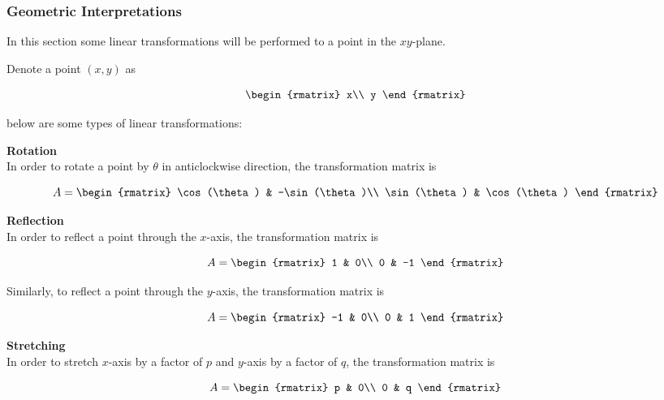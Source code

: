 \documentclass[a4paper,12pt]{article}
\begin{document}
\subsubsection{Geometric Interpretations}
In this section some linear transformations will be performed to a point in the $xy$-plane.\n

\begin{exm}
  Denote a point $(x,y)$ as

  $$\begin{rmatrix}
    x\\
    y
  \end{rmatrix}$$\s

  below are some types of linear transformations:

  \begin{alist}
    \item \textbf{Rotation}\\
    In order to rotate a point by $\theta$ in anticlockwise direction, the transformation matrix is

    $$A=\begin{rmatrix}
      \cos(\theta) & -\sin(\theta)\\
      \sin(\theta) & \cos(\theta)
    \end{rmatrix}$$

    \item \textbf{Reflection}\\
    In order to reflect a point through the $x$-axis, the transformation matrix is

    $$A=\begin{rmatrix}
      1 & 0\\
      0 & -1
    \end{rmatrix}$$\s

    Similarly, to reflect a point through the $y$-axis, the transformation matrix is

    $$A=\begin{rmatrix}
      -1 & 0\\
      0 & 1
    \end{rmatrix}$$

    \item \textbf{Stretching}\\
    In order to stretch $x$-axis by a factor of $p$ and $y$-axis by a factor of $q$, the transformation matrix is

    $$A=\begin{rmatrix}
      p & 0\\
      0 & q
    \end{rmatrix}$$
  \end{alist}
\end{exm}
\end{document}
